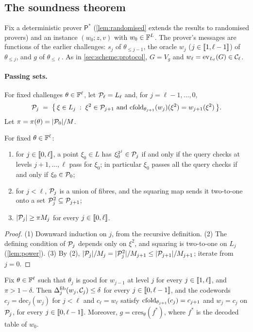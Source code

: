 \subsection{The soundness theorem}\label{sec:sound:thm}

Fix a deterministic prover $\mathsf{P}^*$ (\cref{lem:randomised} extends the results to randomised provers) and an instance $(w_0; z, v)$ with $w_0 \in \mathbb{F}^L$.
The prover's messages are functions of the earlier challenges: $s_j$ of $\theta_{\le j-1}$, the oracle $w_j$ ($j \in \llbracket 1, \ell-1 \rrbracket$) of $\theta_{\le j}$, and $g$ of $\theta_{\le \ell}$.
As in \cref{sec:scheme:protocol}, $G = V_g$ and $w_\ell = \mathrm{ev}_{L_\ell}(G) \in \mathcal{C}_\ell$.

\paragraph{Passing sets.}
For fixed challenges $\theta \in \mathbb{F}^\ell$, let $\mathcal{P}_\ell = L_\ell$ and, for $j = \ell-1, \dots, 0$,
\[
  \mathcal{P}_j \;=\; \bigl\{\, \xi \in L_j \;:\; \xi^2 \in \mathcal{P}_{j+1} \text{ and } \mathrm{cfold}_{\theta_{j+1}}(w_j)(\xi^2) = w_{j+1}(\xi^2) \,\bigr\}.
\]
Let $\pi = \pi(\theta) = |\mathcal{P}_0|/M$.

\begin{lemma}\label{lem:passing}
For fixed $\theta \in \mathbb{F}^\ell$:
\begin{enumerate}
  \item for $j \in \llbracket 0, \ell \rrbracket$, a point $\xi_0 \in L$ has $\xi_0^{2^j} \in \mathcal{P}_j$ if and only if the query checks at levels $j+1,\dots,\ell$ pass for $\xi_0$; in particular $\xi_0$ passes all the query checks if and only if $\xi_0 \in \mathcal{P}_0$;
  \item for $j < \ell$, $\mathcal{P}_j$ is a union of fibres, and the squaring map sends it two-to-one onto a set $\mathcal{P}_j^2 \subseteq \mathcal{P}_{j+1}$;
  \item $|\mathcal{P}_j| \ge \pi M_j$ for every $j \in \llbracket 0, \ell \rrbracket$.
\end{enumerate}
\end{lemma}

\begin{proof}
(1) Downward induction on $j$, from the recursive definition. (2) The defining condition of $\mathcal{P}_j$ depends only on $\xi^2$, and squaring is two-to-one on $L_j$ (\cref{lem:power}). (3) By (2), $|\mathcal{P}_j|/M_j = |\mathcal{P}_j^2|/M_{j+1} \le |\mathcal{P}_{j+1}|/M_{j+1}$; iterate from $j = 0$.
\end{proof}

\begin{lemma}\label{lem:chain}
Fix $\theta \in \mathbb{F}^\ell$ such that $\theta_j$ is good for $w_{j-1}$ at level $j$ for every $j \in \llbracket 1, \ell \rrbracket$, and $\pi > 1-\delta$.
Then $\Delta^{\mathrm{fib}}_j(w_j, \mathcal{C}_j) \le \delta$ for every $j \in \llbracket 0, \ell-1 \rrbracket$, and the codewords $c_j = \mathrm{dec}_j(w_j)$ for $j < \ell$ and $c_\ell = w_\ell$ satisfy $\mathrm{cfold}_{\theta_{j+1}}(c_j) = c_{j+1}$ and $w_j = c_j$ on $\mathcal{P}_j$, for every $j \in \llbracket 0, \ell-1 \rrbracket$.
Moreover, $g = \mathrm{cres}_{\theta}(f^*)$, where $f^*$ is the decoded table of $w_0$.
\end{lemma}

